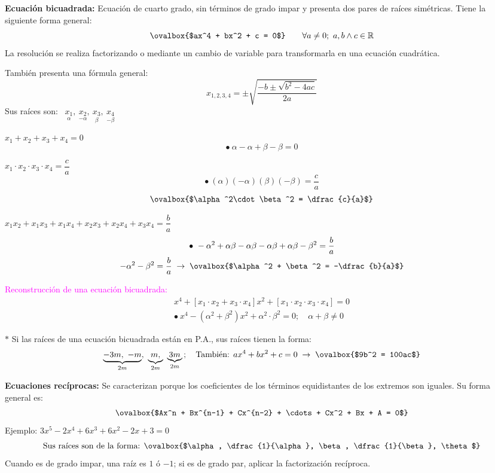 \documentclass[11pt,a4paper]{article}
\newcommand{\cn}[1]{\raisebox{.5pt}{\textcircled{\raisebox{-.9pt}{\scriptsize #1}}}}
\begin{document}
\medskip
\textcolor{naranja}{\textbf{Ecuación bicuadrada:}} Ecuación de cuarto grado, sin términos de
grado impar y presenta dos pares de raíces simétricas. Tiene la siguiente forma general:
\[\ovalbox{$ax^4 + bx^2 + c = 0$} \qquad \forall a \neq 0;\ a, b \wedge c \in \mathbb{R}\]
La resolución se realiza factorizando o mediante un cambio de variable para transformarla
en una ecuación cuadrática.

También presenta una fórmula general:
\[x_{1,2,3,4} = \pm\sqrt{\frac{-b \pm \sqrt{b^2 - 4ac}}{2a}}\]
Sus raíces son: \ $\underset{\alpha}{x_1},\ \underset{-\alpha}{x_2},\ \underset{\beta}{x_3},\ \underset{-\beta}{x_4}$

\begin{minipage}[t]{0.388\textwidth}
\cn{1} $x_1 + x_2 + x_3 + x_4 = 0$
\[\bullet\ \alpha - \alpha + \beta - \beta = 0\]

\cn{3} $x_1\cdot x_2\cdot x_3\cdot x_4 = \dfrac{c}{a}$
\[\bullet\ (\alpha)(-\alpha)(\beta)(-\beta) = \frac{c}{a}\]
\[\ovalbox{$\alpha^2\cdot\beta^2 = \dfrac{c}{a}$}\]
\end{minipage}\hfill
\begin{minipage}[t]{0.582\textwidth}
\cn{2} $x_1x_2 + x_1x_3 + x_1x_4 + x_2x_3 + x_2x_4 + x_3x_4 = \dfrac{b}{a}$
\begin{gather*}
\bullet\ -\alpha^2 + \alpha\beta - \alpha\beta - \alpha\beta + \alpha\beta - \beta^2 = \frac{b}{a}\\
-\alpha^2 - \beta^2 = \frac{b}{a} \;\rightarrow\; \ovalbox{$\alpha^2 + \beta^2 = -\dfrac{b}{a}$}
\end{gather*}

\cn{4} \textcolor{magenta}{Reconstrucción de una ecuación bicuadrada:}
\begin{gather*}
x^4 + [x_1\cdot x_2 + x_3\cdot x_4]x^2 + [x_1\cdot x_2\cdot x_3\cdot x_4] = 0\\
\bullet\ x^4 - (\alpha^2 + \beta^2)x^2 + \alpha^2\cdot\beta^2 = 0;\quad \alpha + \beta \neq 0
\end{gather*}
\end{minipage}

\medskip
$\ast$ Si las raíces de una ecuación bicuadrada están en P.A., sus raíces tienen la forma:
\[\underbrace{-3m,\ -m}_{2m},\ \underbrace{m,}_{2m}\ \underbrace{3m}_{2m}\,; \quad
\text{También: } ax^4 + bx^2 + c = 0 \;\rightarrow\; \ovalbox{$9b^2 = 100ac$}\]

\textcolor{naranja}{\textbf{Ecuaciones recíprocas:}} Se caracterizan porque los coeficientes
de los términos equidistantes de los extremos son iguales. Su forma general es:
\[\ovalbox{$Ax^n + Bx^{n-1} + Cx^{n-2} + \cdots + Cx^2 + Bx + A = 0$}\]
Ejemplo: \quad $3x^5 - 2x^4 + 6x^3 + 6x^2 - 2x + 3 = 0$
\[\text{Sus raíces son de la forma: } \ovalbox{$\alpha, \dfrac{1}{\alpha}, \beta, \dfrac{1}{\beta}, \theta$}\]
Cuando es de grado impar, una raíz es $1$ ó $-1$; si es de grado par, aplicar la
factorización recíproca.
\end{document}
